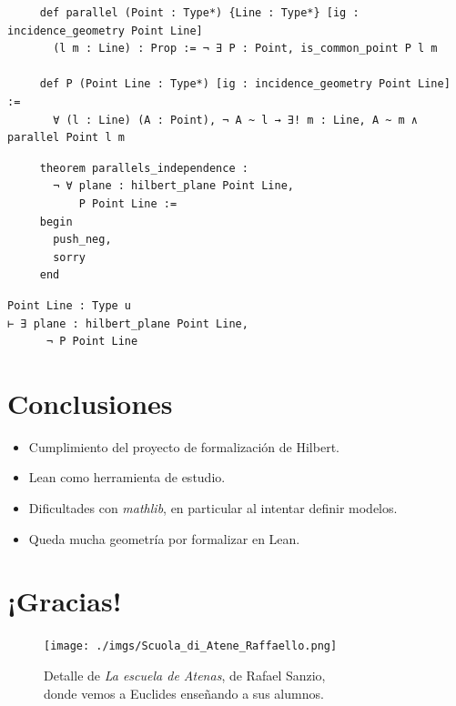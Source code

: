 \documentclass[t, aspectratio=169]{beamer}
\begin{document}
\begin{frame}[fragile]
	\begin{lstlisting}
     def parallel (Point : Type*) {Line : Type*} [ig : incidence_geometry Point Line] 
       (l m : Line) : Prop := ¬ ∃ P : Point, is_common_point P l m

     def P (Point Line : Type*) [ig : incidence_geometry Point Line] := 
       ∀ (l : Line) (A : Point), ¬ A ~ l → ∃! m : Line, A ~ m ∧ parallel Point l m
    \end{lstlisting}

	\begin{multicols}{2}
		\begin{lstlisting}
     theorem parallels_independence :
       ¬ ∀ plane : hilbert_plane Point Line, 
           P Point Line := 
     begin
       push_neg, 
       sorry
     end
        \end{lstlisting}
		\columnbreak

		\begin{lstlisting}
Point Line : Type u
⊢ ∃ plane : hilbert_plane Point Line, 
      ¬ P Point Line
        \end{lstlisting}
	\end{multicols}
\end{frame}

\section{Conclusiones}

\begin{frame}[fragile, c]
	\begin{itemize}[<+->]
		\item Cumplimiento del proyecto de formalización de Hilbert.
		\item Lean como herramienta de estudio.
		\item Dificultades con \textit{mathlib}, en particular al intentar
		      definir modelos.
		\item Queda mucha geometría por formalizar en Lean.
	\end{itemize}
\end{frame}

\section{¡Gracias!}

\begin{frame}[c]
	\vspace{7px}
	\begin{figure}
		\texttt{[image: ./imgs/Scuola\_di\_Atene\_Raffaello.png]}
		\caption*{\scriptsize
			Detalle de \textit{La escuela de Atenas}, de Rafael Sanzio, \\
			donde vemos a Euclides enseñando a sus alumnos.
		}
	\end{figure}
\end{frame}
\end{document}
